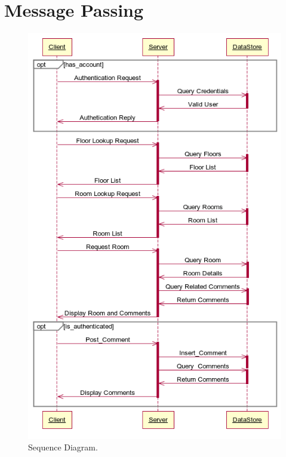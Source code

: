 \documentclass{sig-alt-release2}
\begin{document}


\section{Message Passing}

\begin{figure}
                \includegraphics[scale=0.35]{img/dia.png}
                \caption{Sequence Diagram.}
                \label{img:diagram-sequence}
\end{figure}
\end{document}
